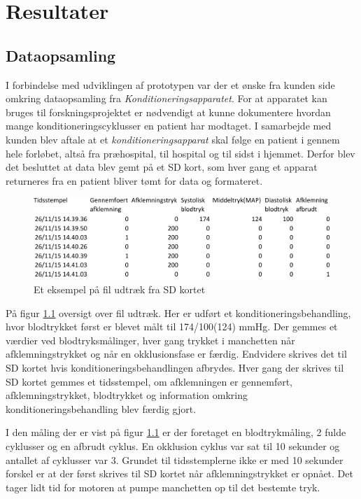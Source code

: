 \chapter{Resultater}



\section{Dataopsamling}
I forbindelse med udviklingen af prototypen var der et ønske fra kunden side omkring dataopsamling fra \textit{Konditioneringsapparatet}. For at apparatet kan bruges til forskningsprojektet er nødvendigt at kunne dokumentere hvordan mange konditioneringscyklusser en patient har modtaget. I samarbejde med kunden blev aftale at et \textit{konditioneringsapparat} skal følge en patient i gennem hele forløbet, altså fra præhospital, til hospital og til sidst i hjemmet. Derfor blev det besluttet at data blev gemt på et SD kort, som hver gang et apparat returneres fra en patient bliver tømt for data og formateret. 

\begin{figure}[H]
	\includegraphics[width = \textwidth]{billeder/fileksempel-crop.pdf}
	\caption{Et eksempel på fil udtræk fra SD kortet}\label{fig:fileksempel}
\end{figure}

På figur \ref{fig:fileksempel} oversigt over fil udtræk. Her er udført et konditioneringsbehandling, hvor blodtrykket først er blevet målt til 174/100(124) mmHg. Der gemmes et værdier ved blodtryksmålinger, hver gang trykket i manchetten når afklemningstrykket og når en okklusionsfase er færdig. Endvidere skrives det til SD kortet hvis konditioneringsbehandlingen afbrydes. Hver gang der skrives til SD kortet gemmes et tidsstempel, om afklemningen er gennemført, afklemningstrykket, blodtrykket og information omkring konditioneringsbehandling blev færdig gjort. 

I den måling der er vist på figur \ref{fig:fileksempel} er der foretaget en blodtrykmåling, 2 fulde cyklusser og en afbrudt cyklus. En okklusion cyklus var sat til 10 sekunder og antallet af cyklusser var 3. Grundet til tidsstemplerne ikke er med 10 sekunder forskel er at der først skrives til SD kortet når afklemningstrykket er opnået. Det tager lidt tid for motoren at pumpe manchetten op til det bestemte tryk. 

